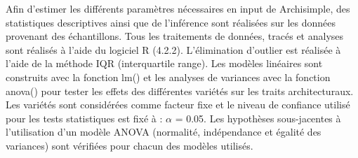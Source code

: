 Afin d'estimer les différents paramètres nécessaires en input de Archisimple, des statistiques descriptives ainsi que de l'inférence sont réalisées sur les données provenant des échantillons.
Tous les traitements de données, tracés et analyses sont réalisés à l'aide du logiciel R (4.2.2).
L'élimination d'outlier est réalisée à l'aide de la méthode IQR (interquartile range).
Les modèles linéaires sont construits avec la fonction lm() et les analyses de variances avec la fonction anova() pour tester les effets des différentes variétés sur les traits architecturaux.
Les variétés sont considérées comme facteur fixe et le niveau de confiance utilisé pour les tests statistiques est fixé à : $\alpha$ = 0.05.
Les hypothèses sous-jacentes à l'utilisation d'un modèle ANOVA (normalité, indépendance et égalité des variances) sont vérifiées pour chacun des modèles utilisés.
\newline

